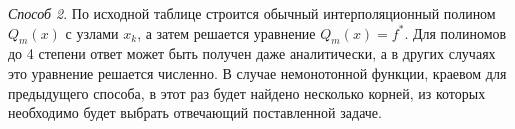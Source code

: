 \emph{Способ 2}. По исходной таблице строится обычный интерполяционный полином $Q_m(x)$ с узлами $x_k$, а затем решается
уравнение $Q_m(x) = f^{*}$. Для полиномов до 4 степени ответ может быть получен даже аналитически, а в других случаях это
уравнение решается численно. В случае немонотонной функции, краевом для предыдущего способа, в этот раз будет найдено
несколько корней, из которых необходимо будет выбрать отвечающий поставленной задаче.
